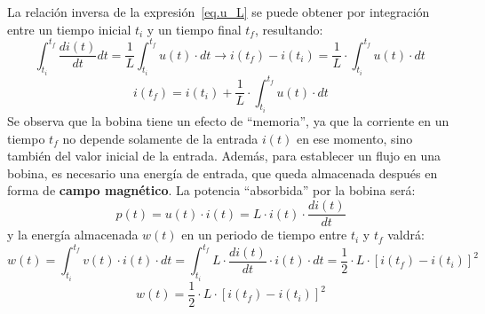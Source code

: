 	La relación inversa de la expresión~\eqref{eq.u_L} se puede
        obtener por integración entre un tiempo inicial $t_i$ y un
        tiempo final $t_f$, resultando:
	\begin{equation*}
          \int_{t_i}^{t_f} \dfrac{di(t)}{dt}dt=\dfrac{1}{L}\int_{t_i}^{t_f}u(t)\cdot dt \rightarrow i(t_f)-i(t_i)=\dfrac{1}{L}\cdot\int_{t_i}^{t_f} u(t)\cdot dt\,
	\end{equation*}
	\begin{equation}
          \boxed{i(t_f)=i(t_i)+\dfrac{1}{L}\cdot\int_{t_i}^{t_f} u(t)\cdot dt}
	\end{equation}
	Se observa que la bobina tiene un efecto de ``memoria'', ya
        que la corriente en un tiempo $t_f$ no depende solamente de la
        entrada $i(t)$ en ese momento, sino también del valor inicial
        de la entrada. Además, para establecer un flujo en una bobina,
        es necesario una energía de entrada, que queda almacenada
        después en forma de \textbf{campo magnético}. La potencia
        ``absorbida'' por la bobina será:
	\begin{equation*}
          p(t)=u(t)\cdot i(t)=L\cdot i(t)\cdot\dfrac{di(t)}{dt}
	\end{equation*}
	y la energía almacenada $w(t)$ en un periodo de tiempo entre
        $t_i$ y $t_f$ valdrá:
	\begin{equation*}
          w(t)=\int_{t_i}^{t_f}v(t)\cdot i(t)\cdot dt=\int_{t_i}^{t_f}L\cdot\dfrac{di(t)}{dt}\cdot i(t)\cdot dt=\dfrac{1}{2}\cdot L\cdot [i(t_f)-i(t_i)]^2
	\end{equation*}
	\begin{equation}
          \boxed{w(t)=\dfrac{1}{2}\cdot L\cdot [i(t_f)-i(t_i)]^2}
	\end{equation}
	
